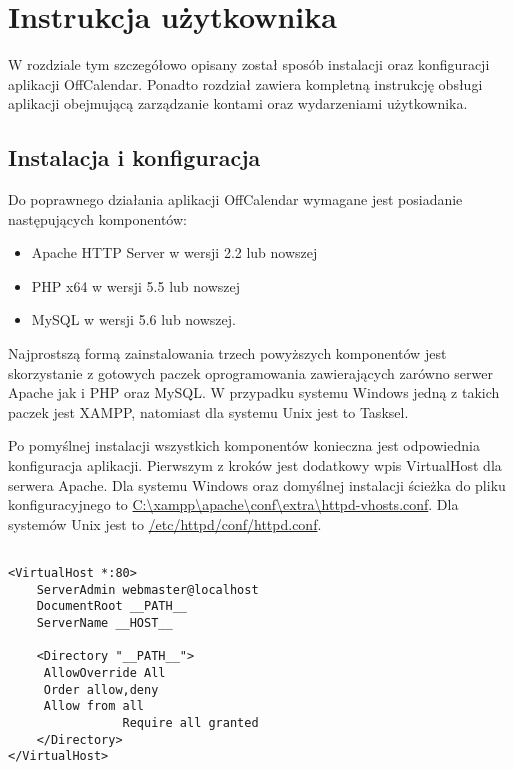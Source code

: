 \chapter{Instrukcja użytkownika}
\label{cha:instrUzytk}

W rozdziale tym szczegółowo opisany został sposób instalacji oraz konfiguracji aplikacji OffCalendar. Ponadto rozdział zawiera kompletną instrukcję obsługi aplikacji obejmującą zarządzanie kontami oraz wydarzeniami użytkownika.

\section{Instalacja i konfiguracja}
\label{sec:instKonf}

Do poprawnego działania aplikacji OffCalendar wymagane jest posiadanie następujących komponentów:

\begin{itemize}
\item Apache HTTP Server w wersji 2.2 lub nowszej
\item PHP x64 w wersji 5.5 lub nowszej
\item MySQL w wersji 5.6 lub nowszej.
\end{itemize}

Najprostszą formą zainstalowania trzech powyższych komponentów jest skorzystanie z gotowych paczek oprogramowania zawierających zarówno serwer Apache jak i PHP oraz MySQL. W przypadku systemu Windows jedną z takich paczek jest XAMPP, natomiast dla systemu Unix jest to Tasksel.

Po pomyślnej instalacji wszystkich komponentów konieczna jest odpowiednia konfiguracja aplikacji. Pierwszym z kroków jest dodatkowy wpis VirtualHost dla serwera Apache. Dla systemu Windows oraz domyślnej instalacji ścieżka do pliku konfiguracyjnego to \url{C:\xampp\apache\conf\extra\httpd-vhosts.conf}. Dla systemów Unix jest to \url{/etc/httpd/conf/httpd.conf}.

\begin{lstlisting}[caption=Konfiguracja serwera Apache., label=amb, captionpos=b]

<VirtualHost *:80>
    ServerAdmin webmaster@localhost
    DocumentRoot __PATH__
    ServerName __HOST__

    <Directory "__PATH__">
   	 AllowOverride All
   	 Order allow,deny
   	 Allow from all
            	Require all granted
    </Directory>
</VirtualHost>

\end{lstlisting}

